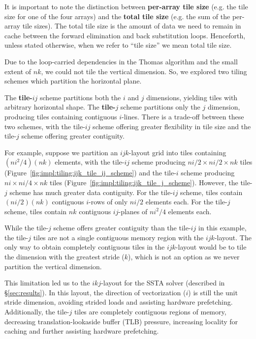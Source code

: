 \documentclass{sig-alternate}
\begin{document}
It is important to note the distinction between \textbf{per-array tile size}
  (e.g. the tile size for one of the four arrays) and the
  \textbf{total tile size} (e.g. the sum of the per-array tile sizes).
The total tile size is the amount of data we need to remain in cache between
  the forward elimination and back substitution loops.
Henceforth, unless stated otherwise, when we refer to ``tile size'' we mean
  total tile size.

Due to the loop-carried dependencies in the Thomas algorithm and the small
  extent of \(nk\), we could not tile the vertical dimension. So, we explored two
  tiling schemes which partition the horizontal plane.

The \textbf{tile-\(ij\)} scheme partitions both the \(i\) and \(j\) dimensions,
  yielding tiles with arbitrary horizontal shape. 
The \textbf{tile-\(j\)} scheme partitions only the \(j\) dimension, producing
  tiles containing contiguous \(i\)-lines.
There is a trade-off between these two schemes, with the tile-\(ij\) scheme
  offering greater flexibility in tile size and the tile-\(j\) scheme offering
  greater contiguity. 

For example, suppose we partition an \(ijk\)-layout grid into tiles containing
  \((ni^2/4)(nk)\) elements, with the tile-\(ij\) scheme producing
  \(ni/2 \times ni/2 \times nk\) tiles
  (Figure~\ref{fig:impl:tiling:ijk_tile_ij_scheme})
  and the tile-\(i\) scheme producing
  \(ni \times ni/4 \times nk\) tiles
  (Figure~\ref{fig:impl:tiling:ijk_tile_j_scheme}).
However, the tile-\(j\) scheme has much greater data contiguity.
For the tile-\(ij\) scheme, tiles contain \((ni/2)(nk)\) contiguous
  \(i\)-rows of only \(ni/2\) elements each.
For the tile-\(j\) scheme, tiles contain \(nk\) contiguous \(ij\)-planes of
  \(ni^2/4\) elements each.

While the tile-\(j\) scheme offers greater contiguity than the
  tile-\(ij\) in this example, the tile-\(j\) tiles are not a single contiguous
  memory region with the \(ijk\)-layout.
The only way to obtain completely contiguous tiles in the \(ijk\)-layout would
  be to tile the dimension with the greatest stride (\(k\)), which is not an
  option as we never partition the vertical dimension.

This limitation led us to the \(ikj\)-layout for the SSTA solver (described
  in \S\ref{sec:results}).
In this layout, the direction of vectorization (\(i\)) is still the unit stride
  dimension, avoiding strided loads and assisting hardware prefetching.
Additionally, the tile-\(j\) tiles are completely contiguous regions of memory,
  decreasing translation-lookaside buffer (TLB) pressure, increasing locality for
  caching and further assisting hardware prefetching.
\end{document}
